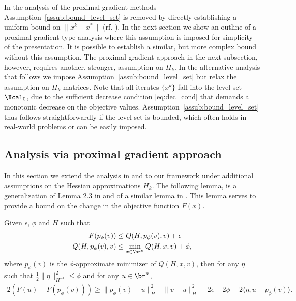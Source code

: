 \documentclass[11pt]{article}
\numberwithin{equation}{section}
\begin{document}
In the analysis of the proximal gradient methods  Assumption~\ref{assub:bound_level_set} is removed by directly establishing a uniform bound on $\|x^k - x^*\|$ (rf. \cite{OML,Schmidtetal}).  In the next section we show an outline of a proximal-gradient type analysis where this assumption is imposed  for simplicity of the presentation. It is possible \cite{OML} to establish a similar, but more complex bound without this assumption.
The proximal gradient approach in the next subsection, however, requires another, stronger, assumption on $H_k$. In the alternative analysis that follows 
we impose Assumption~\ref{assub:bound_level_set} but relax the assumption on $H_k$ matrices. 
Note that all iterates $\{x^k\}$ fall into the level set $\Xcal_0$, due to the sufficient decrease condition \eqref{eq:dec_cond} that demands a monotonic decrease on the objective values. Assumption~\ref{assub:bound_level_set} thus follows straightforwardly if the level set is bounded, which often holds  in real-world problems or can be easily imposed.


\subsection{Analysis via proximal gradient approach}\label{sec:inexact_prox}
In this section we extend the analysis in \cite{Beck2009} and  \cite{Schmidtetal} to our framework under additional assumptions on the Hessian approximations $H_k$.
The following lemma,  is a  generalization of Lemma 2.3 in \cite{Beck2009} and of a similar lemma in \cite{Schmidtetal}.
This lemma serves to provide a bound on the change in the objective function $F(x)$. 
\begin{lemma}
    \label{lem:subp_inexact}
    Given $\epsilon$, $\phi$ and $H$ such that
    \begin{align}
        \label{lem:BT2.3-assump-g}
        F(p_{\phi}(v)) &\leq Q(H, p_{\phi}(v),v) +\epsilon \\
        Q(H, p_{\phi}(v),v) &\leq \min_{x\in\br^n} Q(H,  x,v) + \phi, \nonumber
    \end{align}
    where $p_{\phi}(v)$ is the $\phi$-approximate minimizer of $Q(H, x,v)$, then for any  $\eta$ such that $\frac{1}{2} \| \eta \|^2_{H^{-1}} \leq \phi$
    and for any $u\in \br^n$,
    \begin{align}
        2(F(u) - F(p_{\phi}( v))) \geq \|p_{\phi}( v)-u\|_H^2 - \|v-u\|_H^2-2\epsilon-2\phi-2 \langle \eta, u - p_{\phi}(v) \rangle. \nonumber
    \end{align}
\end{lemma}
\end{document}
